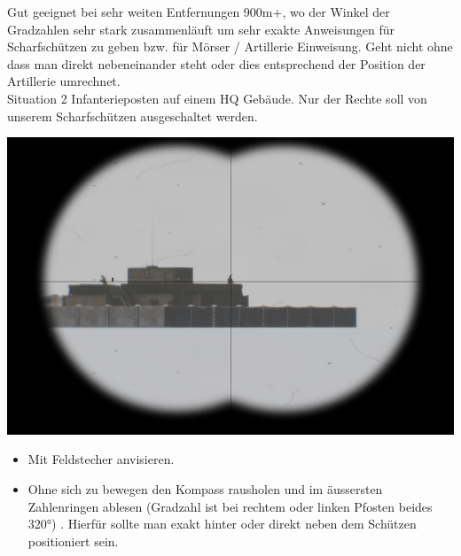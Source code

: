 	Gut geeignet bei sehr weiten Entfernungen 900m+, wo der Winkel der Gradzahlen sehr stark zusammenläuft um sehr exakte Anweisungen für Scharfschützen zu geben bzw. für Mörser / Artillerie Einweisung. Geht nicht ohne dass man direkt nebeneinander steht oder dies entsprechend der Position der Artillerie umrechnet.  \\

 

	Situation 2 Infanterieposten auf einem HQ Gebäude. Nur der Rechte soll von unserem Scharfschützen ausgeschaltet werden.  \\
\begin{minipage}[t]{1\textwidth}
	\includegraphics[width=\textwidth]{./Grafiken/KarteUndMarkierungen/Kompass5.jpg}
\end{minipage}

		\begin{itemize}
 			\item Mit Feldstecher anvisieren.
			\item Ohne sich zu bewegen den Kompass rausholen und im äussersten Zahlenringen ablesen (Gradzahl ist bei rechtem oder linken Pfosten beides 320°) . Hierfür sollte man exakt hinter oder direkt neben dem Schützen positioniert sein.
		\end{itemize}

